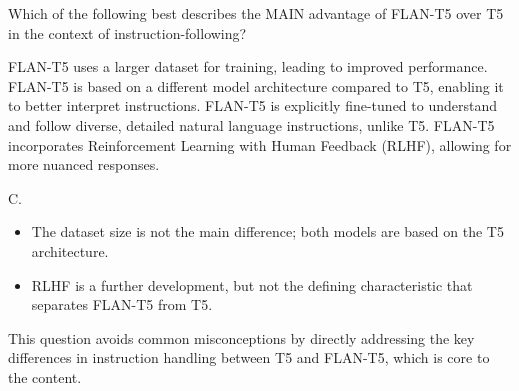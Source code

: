 \documentclass[11pt,addpoints,answers]{exam}
\begin{document}
\begin{questions}
\question[1] Which of the following best describes the MAIN advantage of FLAN-T5 over T5 in the context of instruction-following?
  \begin{choices}
    \choice FLAN-T5 uses a larger dataset for training, leading to improved performance.
    \choice FLAN-T5 is based on a different model architecture compared to T5, enabling it to better interpret instructions.
    \choice FLAN-T5 is explicitly fine-tuned to understand and follow diverse, detailed natural language instructions, unlike T5.
    \choice FLAN-T5 incorporates Reinforcement Learning with Human Feedback (RLHF), allowing for more nuanced responses.
  \end{choices}
\begin{solution}
C.
  \begin{itemize}
    \item The dataset size is not the main difference; both models are based on the T5 architecture.
    \item RLHF is a further development, but not the defining characteristic that separates FLAN-T5 from T5.
  \end{itemize}
  This question avoids common misconceptions by directly addressing the key differences in instruction handling between T5 and FLAN-T5, which is core to the content.
\end{solution}



\end{questions}
\end{document}

